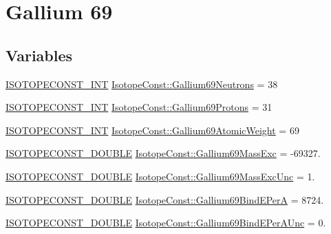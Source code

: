 \hypertarget{group___isotope_const-_gallium-_ga69}{}\section{Gallium 69}
\label{group___isotope_const-_gallium-_ga69}
\subsection*{Variables}
\begin{DoxyCompactItemize}
\item 
\mbox{\hyperlink{group___isotope_const-_macros_ga5f18360b3e99483a35c32d789e62621c}{I\+S\+O\+T\+O\+P\+E\+C\+O\+N\+S\+T\+\_\+\+I\+NT}} \mbox{\hyperlink{group___isotope_const-_gallium-_ga69_ga0807d182f2f281e1d81d0f0765cf5741}{Isotope\+Const\+::\+Gallium69\+Neutrons}} = 38
\item 
\mbox{\hyperlink{group___isotope_const-_macros_ga5f18360b3e99483a35c32d789e62621c}{I\+S\+O\+T\+O\+P\+E\+C\+O\+N\+S\+T\+\_\+\+I\+NT}} \mbox{\hyperlink{group___isotope_const-_gallium-_ga69_ga095d9657ca12b1b8c9869d5dc6fc3dfc}{Isotope\+Const\+::\+Gallium69\+Protons}} = 31
\item 
\mbox{\hyperlink{group___isotope_const-_macros_ga5f18360b3e99483a35c32d789e62621c}{I\+S\+O\+T\+O\+P\+E\+C\+O\+N\+S\+T\+\_\+\+I\+NT}} \mbox{\hyperlink{group___isotope_const-_gallium-_ga69_gab3f191392c7cd52bc960f66df67f38e9}{Isotope\+Const\+::\+Gallium69\+Atomic\+Weight}} = 69
\item 
\mbox{\hyperlink{group___isotope_const-_macros_ga8f45a7272ce02c0b4c65c44636ed719a}{I\+S\+O\+T\+O\+P\+E\+C\+O\+N\+S\+T\+\_\+\+D\+O\+U\+B\+LE}} \mbox{\hyperlink{group___isotope_const-_gallium-_ga69_gab4a83608c4f4759233cd0fbb12806af9}{Isotope\+Const\+::\+Gallium69\+Mass\+Exc}} = -\/69327.
\item 
\mbox{\hyperlink{group___isotope_const-_macros_ga8f45a7272ce02c0b4c65c44636ed719a}{I\+S\+O\+T\+O\+P\+E\+C\+O\+N\+S\+T\+\_\+\+D\+O\+U\+B\+LE}} \mbox{\hyperlink{group___isotope_const-_gallium-_ga69_ga8cad4f84a1279432c00bd6cc5f64ea79}{Isotope\+Const\+::\+Gallium69\+Mass\+Exc\+Unc}} = 1.
\item 
\mbox{\hyperlink{group___isotope_const-_macros_ga8f45a7272ce02c0b4c65c44636ed719a}{I\+S\+O\+T\+O\+P\+E\+C\+O\+N\+S\+T\+\_\+\+D\+O\+U\+B\+LE}} \mbox{\hyperlink{group___isotope_const-_gallium-_ga69_ga466ee8064d9bc4b7a257924ecef55413}{Isotope\+Const\+::\+Gallium69\+Bind\+E\+PerA}} = 8724.
\item 
\mbox{\hyperlink{group___isotope_const-_macros_ga8f45a7272ce02c0b4c65c44636ed719a}{I\+S\+O\+T\+O\+P\+E\+C\+O\+N\+S\+T\+\_\+\+D\+O\+U\+B\+LE}} \mbox{\hyperlink{group___isotope_const-_gallium-_ga69_ga6ef48c87fca5f64c184160dd2a13c5a2}{Isotope\+Const\+::\+Gallium69\+Bind\+E\+Per\+A\+Unc}} = 0.

\end{DoxyCompactItemize}
